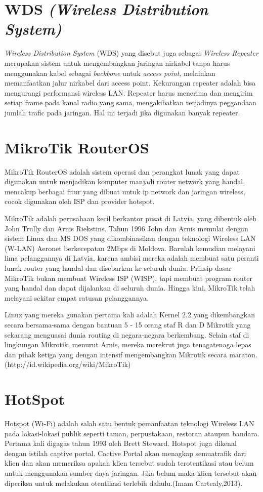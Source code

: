 \documentclass{jtetiproposalskripsi}
\begin{document}
\section{WDS \emph{(Wireless Distribution System)}}
\emph{Wireless Distribution System} (WDS) yang disebut juga sebagai \emph{Wireless Repeater} merupakan sistem untuk mengembangkan jaringan nirkabel tanpa harus menggunakan kabel sebagai \emph{backbone} untuk \emph{access point}, melainkan memanfaatkan jalur nirkabel dari access point. Kekurangan repeater adalah bisa mengurangi performansi wireless LAN. Repeater harus menerima dan mengirim setiap frame pada kanal radio yang sama, mengakibatkan terjadinya peggandaan jumlah trafic pada jaringan. Hal ini terjadi jika digunakan banyak repeater.

\section{MikroTik RouterOS}
MikroTik RouterOS adalah sistem operasi dan perangkat lunak yang dapat digunakan untuk menjadikan komputer manjadi router network yang handal, mencakup berbagai fitur yang dibuat untuk ip network dan jaringan wireless, cocok digunakan oleh ISP dan provider hotspot.

MikroTik adalah perusahaan kecil berkantor pusat di Latvia, yang dibentuk oleh John Trully dan Arnis Riekstins. Tahun 1996 John dan Arnis memulai dengan sistem Linux dan MS DOS yang dikombinasikan dengan teknologi Wireless LAN (W-LAN) Aeronet berkecepatan 2Mbps di Moldova. Barulah kemudian melayani lima pelanggannya di Latvia, karena ambisi mereka adalah membuat satu peranti lunak router yang handal dan disebarkan ke seluruh dunia. Prinsip dasar MikroTik bukan membuat Wireless ISP (WISP), tapi membuat program router yang handal dan dapat dijalankan di seluruh dunia. Hingga kini, MikroTik telah melayani sekitar empat ratusan pelanggannya.

Linux yang mereka gunakan pertama kali adalah Kernel 2.2 yang dikembangkan secara bersama-sama dengan bantuan 5 - 15 orang staf R dan D Mikrotik yang sekarang menguasai dunia routing di negara-negara berkembang. Selain staf di lingkungan Mikrotik, menurut Arnis, mereka merekrut juga tenagatenaga lepas dan pihak ketiga yang dengan intensif mengembangkan Mikrotik secara maraton.(http://id.wikipedia.org/wiki/MikroTik)


\section{HotSpot}
Hotspot (Wi-Fi) adalah salah satu bentuk pemanfaatan teknologi Wireless LAN pada lokasi-lokasi publik seperti taman, perpustakaan, restoran ataupun bandara. Pertama kali digagas tahun 1993 oleh Brett Steward. Hotspot juga dikenal dengan istilah captive portal. Cactive Portal akan menagkap semuatrafik dari klien dan akan memeriksa apakah klien tersebut sudah terotentikasi atau belum untuk menggunakan sumber daya jaringan. Jika belum maka klien tersebut akan diperiksa untuk melakukan otentikasi terlebih dahulu.(Imam Cartealy,2013). 
\end{document}
